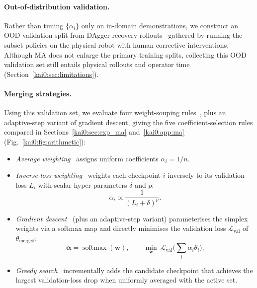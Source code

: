 \paragraph{Out-of-distribution validation.} Rather than tuning $\{\alpha_i\}$ only on in-domain demonstrations, we construct an OOD validation split from DAgger recovery rollouts~\cite{ross2011dagger,kelly2019hgdagger} gathered by running the subset policies on the physical robot with human corrective interventions. Although MA does not enlarge the primary training splits, collecting this OOD validation set still entails physical rollouts and operator time (Section~\ref{kai0:sec:limitations}).

\paragraph{Merging strategies.} Using this validation set, we evaluate four weight-souping rules~\cite{wortsman2022soups}, plus an adaptive-step variant of gradient descent, giving the five coefficient-selection rules compared in Sections~\ref{kai0:sec:exp_ma} and~\ref{kai0:app:ma} (Fig.~\ref{kai0:fig:arithmetic}):
\begin{itemize}
  \item \emph{Average weighting}~\cite{wortsman2022soups} assigns uniform coefficients $\alpha_i = 1/n$.
  \item \emph{Inverse-loss weighting}~\cite{maiti2025souper} weights each checkpoint $i$ inversely to its validation loss $L_i$ with scalar hyper-parameters $\delta$ and $p$:
  \begin{equation}
    \alpha_i \propto \frac{1}{(L_i + \delta)^{p}}.
    \label{kai0:eq:invloss}
  \end{equation}
  \item \emph{Gradient descent}~\cite{sima2026kai0} (plus an adaptive-step variant) parameterises the simplex weights via a softmax map and directly minimises the validation loss $\mathcal{L}_{\mathrm{val}}$ of $\theta_{\mathrm{merged}}$:
  \begin{equation}
    \bm{\alpha} = \operatorname{softmax}(\mathbf{w}), \qquad \min_{\mathbf{w}}\ \mathcal{L}_{\mathrm{val}}\Big(\sum_{i} \alpha_i \theta_i\Big).
    \label{kai0:eq:gd}
  \end{equation}
  \item \emph{Greedy search}~\cite{wortsman2022soups} incrementally adds the candidate checkpoint that achieves the largest validation-loss drop when uniformly averaged with the active set.
\end{itemize}

